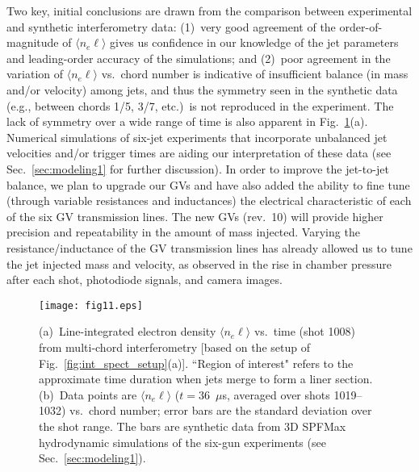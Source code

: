 \documentclass[journal]{IEEEtran}
\begin{document}
Two key, initial conclusions are drawn from the comparison between experimental
and synthetic interferometry data:  (1)~very good agreement of the
order-of-magnitude of $\langle n_e \ell \rangle$ gives
us confidence in our knowledge of the jet parameters and 
leading-order accuracy of the simulations; and (2)~poor agreement in the variation of 
$\langle n_e \ell \rangle$ vs.\ chord number is indicative
of insufficient balance (in mass and/or velocity) among jets, and thus the symmetry seen in the
synthetic data (e.g., between chords 1/5, 3/7, etc.)\ is not reproduced in the experiment.  The lack of symmetry over a wide range of time is also apparent in Fig.~\ref{fig:int_data}(a).
Numerical simulations of six-jet experiments that
incorporate unbalanced jet velocities and/or trigger times are aiding our interpretation of these data 
(see Sec.~\ref{sec:modeling1} for further discussion).
In order to improve the jet-to-jet balance, we
plan to upgrade our GVs
and have also added the ability to fine tune (through variable resistances
and inductances) the electrical characteristic of each of the six GV transmission lines.  The new
GVs (rev.~10) will provide higher precision and repeatability in the amount of mass injected.
Varying the resistance/inductance of the GV transmission lines has already allowed
us to tune the jet injected mass and velocity, as observed in the rise in chamber pressure 
after each shot, photodiode signals, and camera images.

\begin{figure}[!tb]
\centering
\texttt{[image: fig11.eps]}
\caption{(a)~Line-integrated electron density $\langle n_e \ell \rangle$
vs.\ time (shot 1008) from multi-chord interferometry 
[based on the setup of Fig.~\ref{fig:int_spect_setup}(a)].  ``Region of interest" refers to the approximate time 
duration when jets merge to form a liner section.  (b)~Data points are $\langle n_e \ell \rangle$ 
($t=36$~$\mu$s, averaged over shots 1019--1032) vs.\ chord number; error bars
are the standard deviation over the shot range.  The bars are synthetic data from 3D 
SPFMax hydrodynamic
simulations of the six-gun experiments (see Sec.~\ref{sec:modeling1}).}
\label{fig:int_data}
\end{figure}
\end{document}
